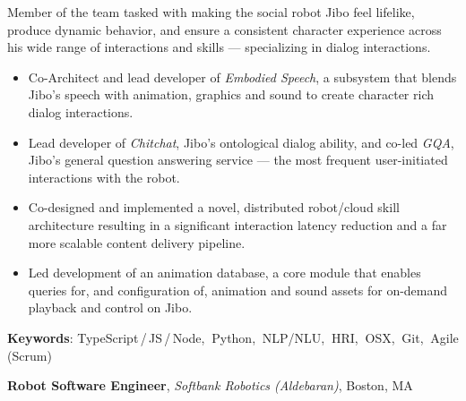 \documentclass[10pt, letter]{article}
\newcommand{\years}[1]{\marginnote{\footnotesize #1}}
\newenvironment{desc*}{
  \begin{description}
    \setlength{\itemsep}{0.2pt}
    \setlength{\parskip}{-1pt}
    \setlength{\parsep}{0pt}
  }{
  \end{description}
}
\begin{document}
\vspace{-.3cm}
Member of the team tasked with making the social robot Jibo feel lifelike, produce dynamic behavior, and ensure a consistent character experience across his wide range of interactions and skills --- specializing in dialog interactions.
\begin{itemize}[leftmargin=*, parsep=-1pt]
\item Co-Architect and lead developer of \textit{Embodied Speech}, a subsystem that blends Jibo's speech with animation, graphics and sound to create character rich dialog interactions.
\item Lead developer of \textit{Chitchat}, Jibo's ontological dialog ability, and co-led \textit{GQA}, Jibo's general question answering service --- the most frequent user-initiated interactions with the robot.
\item Co-designed and implemented a novel, distributed robot/cloud skill architecture resulting in a significant interaction latency reduction and a far more scalable content delivery pipeline.
\item Led development of an animation database, a core module that enables queries for, and configuration of, animation and sound assets for on-demand playback and control on Jibo.
\end{itemize}
\vspace{-.2cm}
\begin{desc*}
\item[\rm \color{redblue} \textbf{Keywords}:] TypeScript\,/\,JS\,/\,Node,$\:$ Python,$\:$ NLP/NLU,$\:$ HRI,$\:$ OSX,$\:$ Git,$\:$ Agile (Scrum)\\
\end{desc*}

\years{2014 - 2016} 
\textbf{\fontsize{10.5pt}{1em}\selectfont Robot Software Engineer},
\textit{Softbank Robotics (Aldebaran)}, Boston, MA\\
\end{document}
